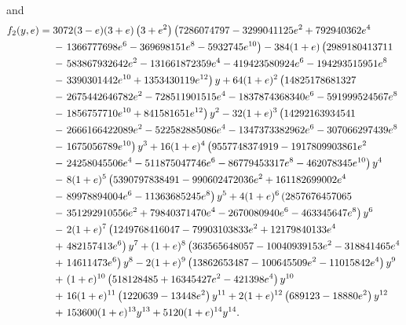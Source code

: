 and
\begin{align}
f_2(y, e) = {} & 3072 (3 - e) (3 + e) \left(3 + e^2 \right) \left(7286074797 - 3299041125 e^2 + 792940362 e^4 \right. \nonumber \\
 {} & - \left. 1366777698 e^6 - 369698151 e^8 - 5932745 e^{10} \right) - 384 (1 + e) \left(2989180413711 \vphantom{e^0} \right. \nonumber \\
 {} & - \left. 583867932642 e^2 - 131661872359 e^4 - 419423580924 e^6 - 194293515951 e^8 \right. \nonumber \\
 {} & - \left. 3390301442 e^{10} + 1353430119 e^{12} \right) {y} + 64 (1 + e)^2 \left(14825178681327 \vphantom{e^0} \right. \nonumber \\
 {} & - \left. 2675442646782 e^2 - 728511901515 e^4 - 1837874368340 e^6 - 591999524567 e^8 \right. \nonumber \\
 {} & - \left. 1856757710 e^{10} + 841581651 e^{12}\right) y^2 - 32 (1 + e)^3 \left(14292163934541 \vphantom{e^0} \right. \nonumber \\
 {} & - \left. 2666166422089 e^2 - 522582885086 e^4 - 1347373382962 e^6 - 307066297439 e^8 \right. \nonumber \\
 {} & - \left. 1675056789 e^{10}\right) y^3 + 16 (1 + e)^4 \left(9557748374919 - 1917809903861 e^2 \right. \nonumber \\
 {} & - \left. 24258045506 e^4 - 511875047746 e^6 - 86779453317 e^8 - 462078345 e^{10}\right) y^4 \nonumber \\
 {} & - \left. 8 (1 + e)^5 \left(5390797838491 - 990602472036 e^2 + 161182699002 e^4 \right.\right. \nonumber \\
 {} & - \left. 89978894004 e^6 - 11363685245 e^8\right) y^5 + 4 (1 + e)^6 \left(2857676457065 \right. \nonumber \\
 {} & - \left. 351292910556 e^2 + 79840371470 e^4 - 2670080940 e^6 - 463345647 e^8 \right) y^6 \nonumber \\
 {} & - \left. 2 (1 + e)^7 \left(1249768416047 - 79903103833 e^2 + 12179840133 e^4 \right.\right. \nonumber \\
 {} & + \left. 482157413 e^6\right) y^7 + (1 + e)^8 \left(363565648057 - 10040939153 e^2 - 318841465 e^4 \right. \nonumber \\
 {} & + \left. 14611473 e^6 \right) y^8 - 2 (1 + e)^9 \left(13862653487 - 100645509 e^2 - 11015842 e^4\right) y^9 \nonumber \\
 {} & + \left. (1 + e)^{10} \left(518128485 + 16345427 e^2 - 421398 e^4\right) y^{10} \right. \nonumber \\
 {} & + \left. 16 (1 + e)^{11} \left(1220639 - 13448 e^2 \right) y^{11} + 2 (1 + e)^{12} \left(689123 - 18880 e^2 \right) y^{12} \right. \nonumber \\
 {} & + \left. 153600 (1 + e)^{13} y^{13} + 5120 (1 + e)^{14} {y}^{14}. \right.
\end{align}

